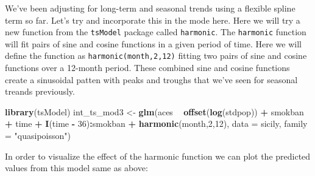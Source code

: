 \documentclass[
]{book}
\newenvironment{Shaded}{\begin{snugshade}}{\end{snugshade}}
\newcommand{\DataTypeTok}[1]{\textcolor[rgb]{0.13,0.29,0.53}{#1}}
\newcommand{\DecValTok}[1]{\textcolor[rgb]{0.00,0.00,0.81}{#1}}
\newcommand{\KeywordTok}[1]{\textcolor[rgb]{0.13,0.29,0.53}{\textbf{#1}}}
\newcommand{\NormalTok}[1]{#1}
\newcommand{\OperatorTok}[1]{\textcolor[rgb]{0.81,0.36,0.00}{\textbf{#1}}}
\newcommand{\StringTok}[1]{\textcolor[rgb]{0.31,0.60,0.02}{#1}}
\begin{document}
We've been adjusting for long-term and seasonal trends using a flexible spline term so far. Let's try and incorporate this in the mode here. Here we will try a new function from the \texttt{tsModel} package called \texttt{harmonic}. The \texttt{harmonic} function will fit pairs of sine and cosine functions in a given period of time. Here we will define the function as \texttt{harmonic(month,2,12)} fitting two pairs of sine and cosine functions over a 12-month period. These combined sine and cosine functions create a sinusoidal patten with peaks and troughs that we've seen for seasonal treands previously.

\begin{Shaded}
\begin{Highlighting}[]
\KeywordTok{library}\NormalTok{(tsModel)}
\NormalTok{int_ts_mod3 <-}\StringTok{ }\KeywordTok{glm}\NormalTok{(aces }\OperatorTok{~}\StringTok{ }\KeywordTok{offset}\NormalTok{(}\KeywordTok{log}\NormalTok{(stdpop)) }\OperatorTok{+}\StringTok{ }\NormalTok{smokban }\OperatorTok{+}\StringTok{ }\NormalTok{time }\OperatorTok{+}\StringTok{ }
\StringTok{                     }\KeywordTok{I}\NormalTok{(time }\OperatorTok{-}\StringTok{ }\DecValTok{36}\NormalTok{)}\OperatorTok{:}\NormalTok{smokban }\OperatorTok{+}\StringTok{ }\KeywordTok{harmonic}\NormalTok{(month,}\DecValTok{2}\NormalTok{,}\DecValTok{12}\NormalTok{), }
                      \DataTypeTok{data =}\NormalTok{ sicily, }
                      \DataTypeTok{family =} \StringTok{"quasipoisson"}\NormalTok{)}
\end{Highlighting}
\end{Shaded}

In order to visualize the effect of the harmonic function we can plot the predicted values from this model same as above:
\end{document}
